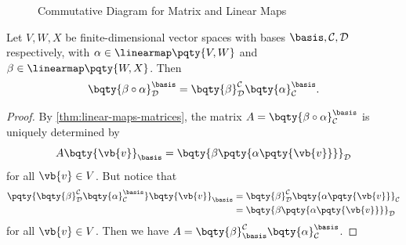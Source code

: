 \begin{figure}[ht!]
    \centering
    \caption{Commutative Diagram for Matrix and Linear Maps}
    \label{fig:commutative-diagram-matrix-linear-maps}%
\end{figure}

\begin{proposition}
    \label{prop:composition-matrix}%
    Let \(V, W, X\) be finite-dimensional vector spaces with bases \(\basis, \mathcal{C}, \mathcal{D}\) respectively, with \(\alpha \in \linearmap\pqty{V, W}\) and \(\beta \in \linearmap\pqty{W, X}\). Then
    \[
        \bqty{\beta \circ \alpha}_{\mathcal{D}}^{\basis} = \bqty{\beta}_{\mathcal{D}}^{\mathcal{C}} \bqty{\alpha}_{\mathcal{C}}^{\basis}.
    \]
\end{proposition}

\begin{proof}
    By \autoref{thm:linear-maps-matrices}, the matrix \(A = \bqty{\beta \circ \alpha}_{\mathcal{C}}^{\basis}\) is uniquely determined by
    \[  
        A \bqty{\vb{v}}_{\basis} = \bqty{\beta\pqty{\alpha\pqty{\vb{v}}}}_{\mathcal{D}}
    \]
    for all \(\vb{v} \in V\). But notice that
    \begin{align*}
        \pqty{\bqty{\beta}_{\mathcal{D}}^{\mathcal{C}} \bqty{\alpha}_{\mathcal{C}}^{\basis}} \bqty{\vb{v}}_{\basis} &= \bqty{\beta}_{\mathcal{D}}^{\mathcal{C}} \bqty{\alpha\pqty{\vb{v}}}_{\mathcal{C}} \\
        &= \bqty{\beta\pqty{\alpha\pqty{\vb{v}}}}_{\mathcal{D}}
    \end{align*}
    for all \(\vb{v} \in V\). Then we have \(A = \bqty{\beta}_{\basis}^{\mathcal{C}} \bqty{\alpha}_{\mathcal{C}}^{\basis}\).
\end{proof}

